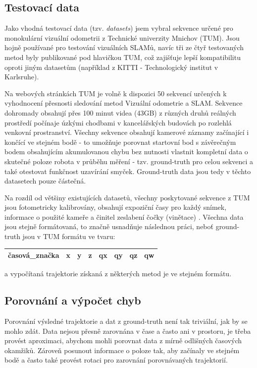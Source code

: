\documentclass[12pt,a4paper]{article}
\begin{document}
\subsection{Testovací data}
Jako vhodná testovací data (tzv. \textit{datasets}) jsem vybral sekvence určené pro monokulární vizuální odometrii z Technické univerzity Mnichov (TUM). Jsou hojně používané pro testování vizuálních SLAMů, navíc tři ze čtyř testovaných metod byly publikované pod hlavičkou TUM, což zajišťuje lepší kompatibilitu oproti jiným datasetům (například z KITTI - Technologický institut v Karlsruhe). 

Na webových stránkách TUM je volně k dispozici 50 sekvencí určených k vyhodnocení přesnosti sledování metod Vizuální odometrie a SLAM. Sekvence dohromady obsahují přes 100 minut videa (43GB) z různých druhů reálných prostředí počínaje úzkými chodbami v kancelářských budovách po rozlehlá venkovní prostranství. Všechny sekvence obsahují kamerové záznamy začínající i končící ve stejném bodě - to umožňuje porovnat startovní bod s závěrečným bodem obsahujícím akumulovanou chybu bez nutnosti vlastnit kompletní data o skutečné poloze robota v průběhu měření - tzv. ground-truth pro celou sekvenci a také otestovat funkčnost uzavírání smyček. Ground-truth data jsou  tedy v těchto datasetech pouze částečná.

Na rozdíl od většiny existujících datasetů, všechny poskytované sekvence z TUM jsou fotometricky kalibrovány, obsahují expoziční časy pro každý snímek, informace o použité kameře a činitel zeslabení čočky (vinětace) \cite{TUM_datasets}. Všechna data jsou stejně formátovaná, to značně usnadňuje následnou práci, neboť ground-truth jsou v TUM formátu ve tvaru:

\begin{center}
\begin{tabular}{|l|l|l|l|l|l|l|l|}
\hline
časová\_značka & x & y & z & qx & qy & qz & qw \\
\hline
\end{tabular}
\end{center}
a vypočítaná trajektorie získaná z některých metod je ve stejném formátu.

\subsection{Porovnání a výpočet chyb}
Porovnání výsledné trajektorie a dat z ground-truth není tak triviální, jak by se mohlo zdát. Data nejsou přesně zarovnána v čase a často ani v prostoru, je třeba provést aproximaci, abychom mohli porovnat data z mírně odlišných časových okamžiků. Zároveň posunout informace o poloze tak, aby začínaly ve stejném bodě a často také provést rotaci pro zarovnání porovnávaných trajektorií.
\end{document}
